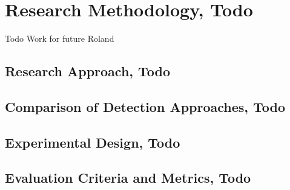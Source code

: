 
\section{Research Methodology, Todo}

Todo
Work for future Roland

\subsection{Research Approach, Todo}
\subsection{Comparison of Detection Approaches, Todo}
\subsection{Experimental Design, Todo}
\subsection{Evaluation Criteria and Metrics, Todo}

